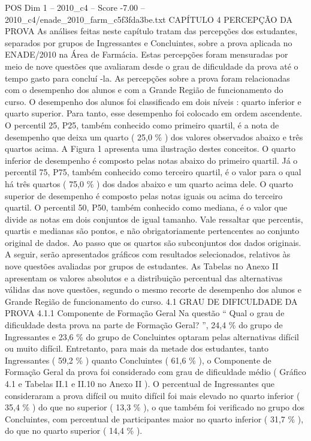 \begin{textsample}{POS Dim 1 – 2010\_c4 – Score -7.00 – 2010\_c4/enade\_2010\_farm\_c5f3fda3be.txt}  \label{ex:f1_pos_407}
CAPÍTULO 4 PERCEPÇÃO DA PROVA As análises feitas neste capítulo tratam das percepções dos estudantes, separados por grupos de Ingressantes e Concluintes, sobre a prova aplicada no ENADE/2010 na Área de Farmácia.
Estas percepções foram mensuradas por meio de nove questões que avaliaram desde o grau de dificuldade da prova até o tempo gasto para concluí -la.
As percepções sobre a prova foram relacionadas com o desempenho dos alunos e com a Grande Região de funcionamento do curso.
O desempenho dos alunos foi classificado em dois níveis : quarto inferior e quarto superior.
Para tanto, esse desempenho foi colocado em ordem ascendente.
O percentil 25, P25, também conhecido como primeiro quartil, é a nota de desempenho que deixa um quarto ( 25,0 \% ) dos valores observados abaixo e três quartos acima.
A Figura 1 apresenta uma ilustração destes conceitos.
O quarto inferior de desempenho é composto pelas notas abaixo do primeiro quartil.
Já o percentil 75, P75, também conhecido como terceiro quartil, é o valor para o qual há três quartos ( 75,0 \% ) dos dados abaixo e um quarto acima dele.
O quarto superior de desempenho é composto pelas notas iguais ou acima do terceiro quartil.
O percentil 50, P50, também conhecido como mediana, é o valor que divide as notas em dois conjuntos de igual tamanho.
Vale ressaltar que percentis, quartis e medianas são pontos, e não obrigatoriamente pertencentes ao conjunto original de dados.
Ao passo que os quartos são subconjuntos dos dados originais.
A seguir, serão apresentados gráficos com resultados selecionados, relativos às nove questões avaliadas por grupos de estudantes.
As Tabelas no Anexo II apresentam os valores absolutos e a distribuição percentual das alternativas válidas das nove questões, segundo o mesmo recorte de desempenho dos alunos e Grande Região de funcionamento do curso. 4.1 GRAU DE DIFICULDADE DA PROVA 4.1.1 Componente de Formação Geral Na questão “ Qual o grau de dificuldade desta prova na parte de Formação Geral? ”, 24,4 \% do grupo de Ingressantes e 23,6 \% do grupo de Concluintes optaram pelas alternativas difícil ou muito difícil.
Entretanto, para mais da metade dos estudantes, tanto Ingressantes ( 59,2 \% ) quanto Concluintes ( 61,6 \% ), o Componente de Formação Geral da prova foi considerado com grau de dificuldade médio ( Gráfico 4.1 e Tabelas II.1 e II.10 no Anexo II ).
O percentual de Ingressantes que consideraram a prova difícil ou muito difícil foi mais elevado no quarto inferior ( 35,4 \% ) do que no superior ( 13,3 \% ), o que também foi verificado no grupo dos Concluintes, com percentual de participantes maior no quarto inferior ( 31,7 \% ), do que no quarto superior ( 14,4 \% ).

\end{textsample}
